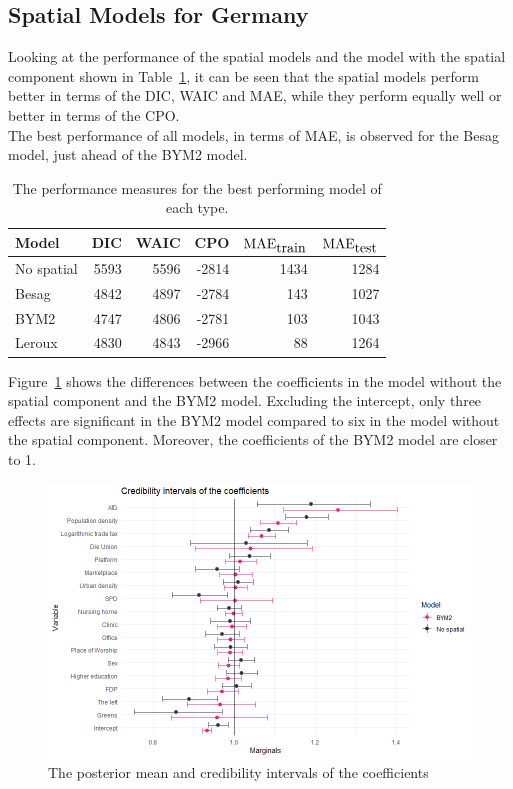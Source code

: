 \subsection{Spatial Models for Germany}\label{sec:spatial_germany}
Looking at the performance of the spatial models and the model with the spatial component shown in Table~\ref{allGermany}, it can be seen that the spatial models perform better in terms of the DIC, WAIC and MAE, while they perform equally well or better in terms of the CPO. \\
The best performance of all models, in terms of MAE, is observed for the Besag model, just ahead of the BYM2 model.
\begin{table}[H] 
\caption{The performance measures for the best performing model of each type. \label{allGermany}}
\begin{tabular}{l r r r r r}
\toprule
\textbf{Model}	& \textbf{DIC}	& \textbf{WAIC} & \textbf{CPO} & \textbf{$\hbox{MAE}_{\hbox{train}}$} & \textbf{$\hbox{MAE}_{\hbox{test}}$}\\
\midrule
No spatial & 5593 & 5596 & -2814 & 1434 & 1284 \\
Besag & 4842 & 4897 & -2784 & 143 & 1027\\
BYM2 & 4747 & 4806 & -2781 & 103 & 1043\\
Leroux & 4830 & 4843 & -2966 & 88 & 1264 \\
\bottomrule
\end{tabular}
\end{table}
Figure~\ref{intervalGermany} shows the differences between the coefficients in the model without the spatial component and the BYM2 model. Excluding the intercept, only three effects are significant in the BYM2 model compared to six in the model without the spatial component. Moreover, the coefficients of the BYM2 model are closer to 1. 
\begin{figure}[H]
  \centering
  \includegraphics[width = \textwidth]{intervals_germany.png}
  \caption{The posterior mean and credibility intervals of the coefficients}
  \label{intervalGermany}
\end{figure}
